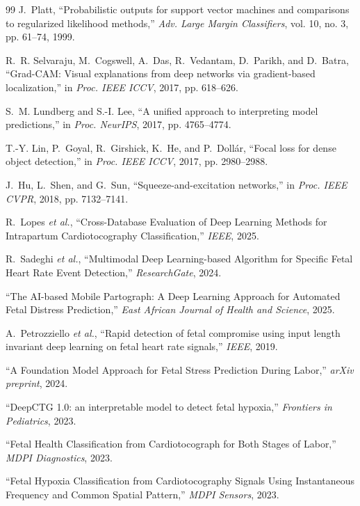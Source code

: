 \documentclass[conference]{IEEEtran}
\begin{document}
\begin{thebibliography}{99}
J.~Platt, ``Probabilistic outputs for support vector machines and comparisons
to regularized likelihood methods,''
\textit{Adv. Large Margin Classifiers}, vol. 10, no. 3, pp. 61--74, 1999.

R.~R. Selvaraju, M.~Cogswell, A.~Das, R.~Vedantam, D.~Parikh, and D.~Batra,
``Grad-CAM: Visual explanations from deep networks via gradient-based
localization,''
in \textit{Proc. IEEE ICCV}, 2017, pp. 618--626.

S.~M. Lundberg and S.-I. Lee,
``A unified approach to interpreting model predictions,''
in \textit{Proc. NeurIPS}, 2017, pp. 4765--4774.

T.-Y. Lin, P.~Goyal, R.~Girshick, K.~He, and P.~Dollár,
``Focal loss for dense object detection,''
in \textit{Proc. IEEE ICCV}, 2017, pp. 2980--2988.

J.~Hu, L.~Shen, and G.~Sun, ``Squeeze-and-excitation networks,''
in \textit{Proc. IEEE CVPR}, 2018, pp. 7132--7141.

R.~Lopes \textit{et al.}, ``Cross-Database Evaluation of Deep Learning Methods
for Intrapartum Cardiotocography Classification,'' \textit{IEEE}, 2025.

R.~Sadeghi \textit{et al.}, ``Multimodal Deep Learning-based Algorithm for
Specific Fetal Heart Rate Event Detection,'' \textit{ResearchGate}, 2024.

``The AI-based Mobile Partograph: A Deep Learning Approach for Automated
Fetal Distress Prediction,'' \textit{East African Journal of Health and
Science}, 2025.

A.~Petrozziello \textit{et al.}, ``Rapid detection of fetal compromise using
input length invariant deep learning on fetal heart rate signals,''
\textit{IEEE}, 2019.

``A Foundation Model Approach for Fetal Stress Prediction During Labor,''
\textit{arXiv preprint}, 2024.

``DeepCTG 1.0: an interpretable model to detect fetal hypoxia,''
\textit{Frontiers in Pediatrics}, 2023.

``Fetal Health Classification from Cardiotocograph for Both Stages of Labor,''
\textit{MDPI Diagnostics}, 2023.

``Fetal Hypoxia Classification from Cardiotocography Signals Using
Instantaneous Frequency and Common Spatial Pattern,''
\textit{MDPI Sensors}, 2023.

\end{thebibliography}
\end{document}
